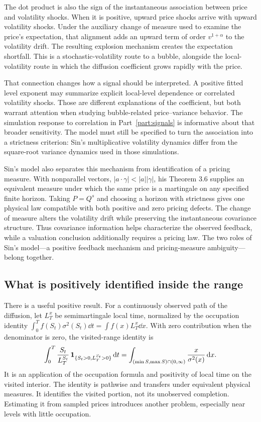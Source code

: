 The dot product is also the sign of the instantaneous association between
price and volatility shocks. When it is positive, upward price shocks
arrive with upward volatility shocks. Under the auxiliary change of measure
used to examine the price's expectation, that alignment adds an upward
term of order $v^{1+\alpha}$ to the volatility drift. The resulting
explosion mechanism creates the expectation shortfall. This is a
stochastic-volatility route to a bubble, alongside the local-volatility
route in which the diffusion coefficient grows rapidly with the price.

That connection changes how a signal should be interpreted. A positive
fitted level exponent may summarize explicit local-level dependence or
correlated volatility shocks. Those are different explanations of the
coefficient, but both warrant attention when studying bubble-related
price--variance behavior. The simulation response to correlation in
Part~\ref{part:signals} is informative about that broader sensitivity.
The model must still be specified to turn the association into a strictness
criterion: Sin's multiplicative volatility dynamics differ from the
square-root variance dynamics used in those simulations.

Sin's model also separates this mechanism from identification of a pricing
measure. With nonparallel vectors,
$|a\cdot\gamma|<|a||\gamma|$, his Theorem 3.6 supplies an equivalent
measure under which the same price is a martingale on any specified finite
horizon. Taking $P=Q^s$ and choosing a horizon with strictness gives one
physical law compatible with both positive and zero pricing defects.
The change of measure alters the volatility drift while preserving the
instantaneous covariance structure. Thus covariance information helps
characterize the observed feedback, while a valuation conclusion additionally
requires a pricing law. The two roles of Sin's model---a positive feedback
mechanism and pricing-measure ambiguity---belong together.

\subsection{What is positively identified inside the range}
There is a useful positive result. For a continuously observed path of the
diffusion, let $L_T^x$ be semimartingale local time, normalized by the
occupation identity
$\int_0^T f(S_t)\sigma^2(S_t)\dd t=\int f(x)L_T^x\dd x$.
With zero contribution when the denominator is zero, the visited-range
identity is
\begin{equation}\label{eq:visited}
 \int_0^T\frac{S_t}{L_T^{S_t}}\,
     \mathbf{1}_{\{S_t>0,L_T^{S_t}>0\}}\,\mathrm{d} t
 =\int_{(\min S,\max S)\cap(0,\infty)}
        \frac{x}{\sigma^2(x)}\,\mathrm{d} x.
\end{equation}
It is an application of the occupation formula and positivity of local time
on the visited interior. The identity is pathwise and transfers under
equivalent physical measures. It identifies the visited portion, not its
unobserved completion. Estimating it from sampled prices introduces another
problem, especially near levels with little occupation.

